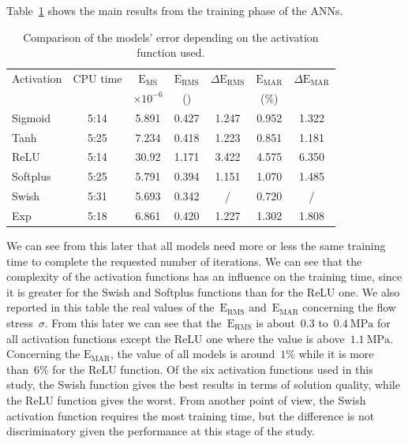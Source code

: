 \documentclass[algorithms,article,submit,pdftex,oneauthors]{Definitions/mdpi}
\DeclareRobustCommand{\MSE}{\text{E}_\text{MS}}
\DeclareRobustCommand{\RMSE}{\text{E}_\text{RMS}}
\DeclareRobustCommand{\MARE}{\text{E}_\text{MAR}}
\DeclareRobustCommand{\MPa}{\text{MPa}}
\begin{document}
Table~\ref{tab:Training} shows the main results from the training phase of the ANNs.
\begin{table}[h!]
\caption{Comparison of the models' error depending on the activation function used.\label{tab:Training}}
\begin{tabular}{lcccccc}
\toprule
Activation & CPU time & $\MSE$ & $\RMSE$ & $\Delta\RMSE$ & $\MARE$ & $\Delta\MARE$ \\
 & & $\times 10^{-6}$ & (\MPa) & & (\%) &\\ \midrule
Sigmoid & 5:14 & 5.891 & 0.427 & 1.247 & 0.952 & 1.322\\
Tanh & 5:25 & 7.234 & 0.418 & 1.223 & 0.851 & 1.181\\
ReLU & 5:14 & 30.92 & 1.171 & 3.422 & 4.575 & 6.350\\
Softplus & 5:25 & 5.791 & 0.394 & 1.151 & 1.070 & 1.485\\
Swish & 5:31 & 5.693 & 0.342 & / &0.720 & / \\
Exp & 5:18 & 6.861 & 0.420 & 1.227 & 1.302 & 1.808\\
\bottomrule
\end{tabular}
\end{table}
We can see from this later that all models need more or less the same training time to complete the requested number of iterations.
We can see that the complexity of the activation functions has an influence on the training time, since it is greater for the Swish and Softplus functions than for the ReLU one.
We also reported in this table the real values of the~$\RMSE$ and~$\MARE$ concerning the flow stress~$\sigma$.
From this later we can see that the~$\RMSE$ is about~$0.3$ to~$0.4~\MPa$ for all activation functions except the ReLU one where the value is above~$1.1~\MPa$.
Concerning the $\MARE$, the value of all models is around~$1\%$ while it is more than~$6\%$ for the ReLU function.
Of the six activation functions used in this study, the Swish function gives the best results in terms of solution quality, while the ReLU function gives the worst.
From another point of view, the Swish activation function requires the most training time, but the difference is not discriminatory given the performance at this stage of the study.
\end{document}
